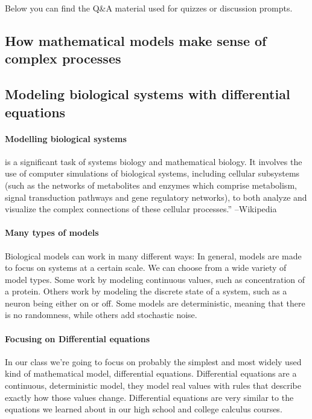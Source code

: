 Below you can find the Q\&A material used for quizzes or discussion prompts.


\subsection{How mathematical models make sense of complex processes}

% 


\subsection{Modeling biological systems with differential equations}
\paragraph{Modelling biological systems} is a significant task of systems biology and mathematical biology. It involves the use of computer simulations of biological systems, including cellular subsystems (such as the networks of metabolites and enzymes which comprise metabolism, signal transduction pathways and gene regulatory networks), to both analyze and visualize the complex connections of these cellular processes.'' --Wikipedia

\paragraph{Many types of models} Biological models can work in many different ways:  In general, models are made to focus on systems at a certain scale.  We can choose from a wide variety of model types. Some work by modeling continuous values, such as concentration of a protein.  Others work by modeling the discrete state of a system, such as a neuron being either on or off.  Some models are deterministic, meaning that there is no randomness, while others add stochastic noise.

\paragraph{Focusing on Differential equations} In our class we're going to focus on probably the simplest and most widely used kind of mathematical model, differential equations.  Differential equations are a continuous, deterministic model, they model real values with rules that describe exactly how those values change.  Differential equations are very similar to the equations we learned about in our high school and college calculus courses.

